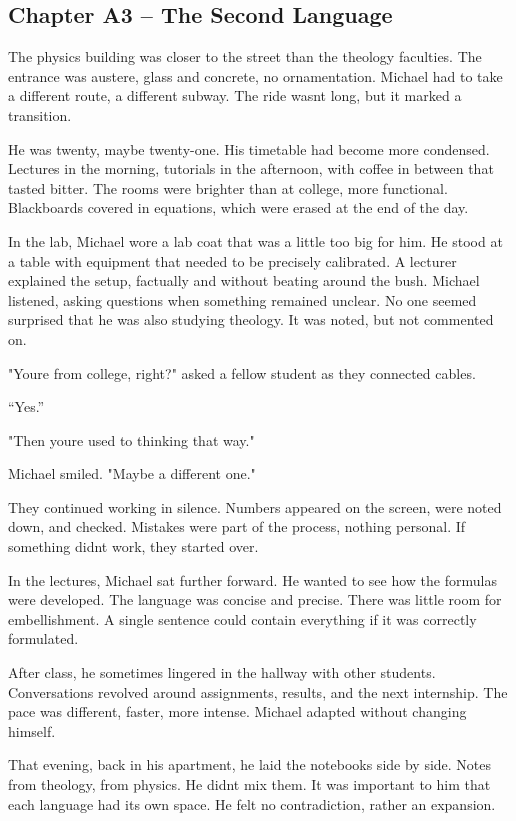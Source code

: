 \documentclass[
]{article}
\begin{document}
\subsection{Chapter A3 -- The Second Language}\label{chapter-a3-the-second-language}

The physics building was closer to the street than the theology faculties. The entrance was austere, glass and concrete, no ornamentation. Michael had to take a different route, a different subway. The ride wasn\textquotesingle t long, but it marked a transition.

He was twenty, maybe twenty-one. His timetable had become more condensed. Lectures in the morning, tutorials in the afternoon, with coffee in between that tasted bitter. The rooms were brighter than at college, more functional. Blackboards covered in equations, which were erased at the end of the day.

In the lab, Michael wore a lab coat that was a little too big for him. He stood at a table with equipment that needed to be precisely calibrated. A lecturer explained the setup, factually and without beating around the bush. Michael listened, asking questions when something remained unclear. No one seemed surprised that he was also studying theology. It was noted, but not commented on.

"You\textquotesingle re from college, right?" asked a fellow student as they connected cables.

``Yes.''

"Then you\textquotesingle re used to thinking that way."

Michael smiled. "Maybe a different one."

They continued working in silence. Numbers appeared on the screen, were noted down, and checked. Mistakes were part of the process, nothing personal. If something didn\textquotesingle t work, they started over.

In the lectures, Michael sat further forward. He wanted to see how the formulas were developed. The language was concise and precise. There was little room for embellishment. A single sentence could contain everything if it was correctly formulated.

After class, he sometimes lingered in the hallway with other students. Conversations revolved around assignments, results, and the next internship. The pace was different, faster, more intense. Michael adapted without changing himself.

That evening, back in his apartment, he laid the notebooks side by side. Notes from theology, from physics. He didn\textquotesingle t mix them. It was important to him that each language had its own space. He felt no contradiction, rather an expansion.
\end{document}
